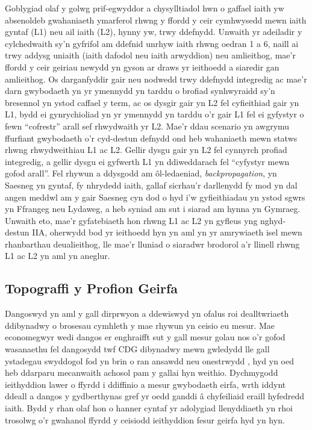 Goblygiad olaf y golwg prif-egwyddor a chysylltiadol hwn o gaffael iaith yw absenoldeb gwahaniaeth ymarferol rhwng y ffordd y ceir cymhwysedd mewn iaith gyntaf (L1) neu ail iaith (L2), hynny yw, trwy ddefnydd. Unwaith yr adeiladir y cylchedwaith sy'n gyfrifol am ddefnid unrhyw iaith rhwng oedran 1 a 6, naill ai trwy addysg uniaith (iaith dafodol neu iaith arwyddion) neu amlieithog, mae'r ffordd y ceir geiriau newydd yn gyson ar draws yr ieithoedd a siaredir gan amlieithog. Os darganfyddir gair neu nodwedd trwy ddefnydd integredig ac mae'r darn gwybodaeth yn yr ymennydd yn tarddu o brofiad synhwyraidd sy'n bresennol yn ystod caffael y term, ac os dysgir gair yn L2 fel cyfieithiad gair yn L1, bydd ei gynrychioliad yn yr ymennydd yn tarddu o'r gair L1 fel ei gyfystyr o fewn ``cofrestr'' arall sef rhwydwaith yr L2. Mae'r ddau scenario yn awgrymu ffurfiant gwybodaeth o'r cyd-destun defnydd ond heb wahaniaeth mewn statws rhwng rhwydweithiau L1 ac L2. Gellir dysgu gair yn L2 fel cynnyrch profiad integredig, a gellir dysgu ei gyfwerth L1 yn ddiweddarach fel ``cyfystyr mewn gofod arall''. Fel rhywun a ddysgodd am ôl-ledaeniad, \textit{backpropagation}, yn Saesneg yn gyntaf, fy nhrydedd iaith, gallaf sicrhau'r darllenydd fy mod yn dal angen meddwl am y gair Saesneg cyn dod o hyd i'w gyfieithiadau yn ystod sgwrs yn Ffrangeg neu Lydaweg, a heb syniad am sut i siarad am hynna yn Gymraeg. Unwaith eto, mae'r gyfatebiaeth hon rhwng L1 ac L2 yn gyfleus yng nghyd-destun IIA, oherwydd bod yr ieithoedd hyn yn aml yn yr amrywiaeth isel mewn rhanbarthau deualieithog, lle mae'r lluniad o siaradwr brodorol a'r llinell rhwng L1 ac L2 yn aml yn aneglur.

\subsection{Topograffi y Profion Geirfa}
Dangoswyd yn aml y gall dirprwyon a ddewiswyd yn ofalus roi dealltwriaeth ddibynadwy o brosesau cymhleth y mae rhywun yn ceisio eu mesur. Mae economegwyr wedi dangos er enghraifft sut y gall mesur golau nos o'r gofod wasanaethu fel dangosydd twf CDG dibynadwy mewn gwledydd lle gall ystadegau swyddogol fod yn brin o ran ansawdd neu onestrwydd \parencite{henderson_measuring_2009}, hyd yn oed heb ddarparu mecanwaith achosol pam y gallai hyn weithio. Dychmygodd ieithyddion lawer o ffyrdd i ddiffinio a mesur gwybodaeth eirfa, wrth iddynt ddeall a dangos y gydberthynas gref yr oedd ganddi â chyfeiliaid eraill hyfedredd iaith. Bydd y rhan olaf hon o hanner cyntaf yr adolygiad llenyddiaeth yn rhoi trosolwg o'r gwahanol ffyrdd y ceisiodd ieithyddion fesur geirfa hyd yn hyn.

